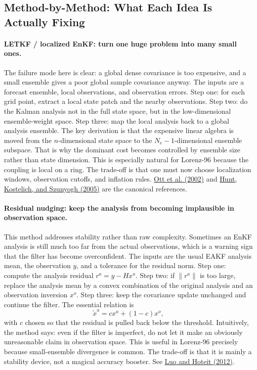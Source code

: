 \documentclass[12pt,a4paper]{article}
\begin{document}
\subsection{Method-by-Method: What Each Idea Is Actually Fixing}

\paragraph{LETKF / localized EnKF: turn one huge problem into many small ones.}
The failure mode here is clear: a global dense covariance is too expensive, and a small ensemble gives a poor global sample covariance anyway. The inputs are a forecast ensemble, local observations, and observation errors. Step one: for each grid point, extract a local state patch and the nearby observations. Step two: do the Kalman analysis not in the full state space, but in the low-dimensional ensemble-weight space. Step three: map the local analysis back to a global analysis ensemble. The key derivation is that the expensive linear algebra is moved from the \(n\)-dimensional state space to the \(N_e-1\)-dimensional ensemble subspace. That is why the dominant cost becomes controlled by ensemble size rather than state dimension. This is especially natural for Lorenz-96 because the coupling is local on a ring. The trade-off is that one must now choose localization windows, observation cutoffs, and inflation rules. \href{https://arxiv.org/abs/physics/0203058}{Ott et al. (2002)} and \href{https://arxiv.org/abs/physics/0511236}{Hunt, Kostelich, and Szunyogh (2005)} are the canonical references.

\paragraph{Residual nudging: keep the analysis from becoming implausible in observation space.}
This method addresses stability rather than raw complexity. Sometimes an EnKF analysis is still much too far from the actual observations, which is a warning sign that the filter has become overconfident. The inputs are the usual EAKF analysis mean, the observation \(y\), and a tolerance for the residual norm. Step one: compute the analysis residual \(r^a = y - Hx^a\). Step two: if \(\lVert r^a \rVert\) is too large, replace the analysis mean by a convex combination of the original analysis and an observation inversion \(x^o\). Step three: keep the covariance update unchanged and continue the filter. The essential relation is
\[
\tilde x^a = c x^a + (1-c)x^o,
\]
with \(c\) chosen so that the residual is pulled back below the threshold. Intuitively, the method says: even if the filter is imperfect, do not let it make an obviously unreasonable claim in observation space. This is useful in Lorenz-96 precisely because small-ensemble divergence is common. The trade-off is that it is mainly a stability device, not a magical accuracy booster. See \href{https://arxiv.org/abs/1210.1318}{Luo and Hoteit (2012)}.
\end{document}
